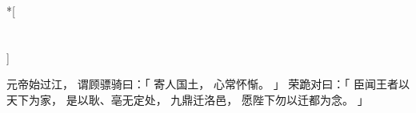 
\switchcolumn[0]*[\section{}]

元帝始过江，
谓顾骠骑曰：「
    寄人国土，
    心常怀惭。
」
荣跪对曰：「
    臣闻王者以天下为家，
    是以耿、亳无定处，
    九鼎迁洛邑，
    愿陛下勿以迁都为念。
」

\switchcolumn



